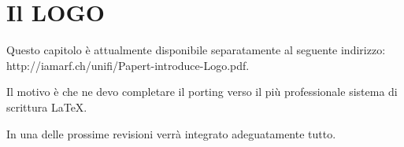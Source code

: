 \chapter{Il LOGO} \label{cap:papert2}

Questo capitolo è attualmente disponibile separatamente al seguente indirizzo: http://iamarf.ch/unifi/Papert-introduce-Logo.pdf.

Il motivo è che ne devo completare il porting verso il più professionale sistema di scrittura \LaTeX.

In una delle prossime revisioni verrà integrato adeguatamente tutto.
 
